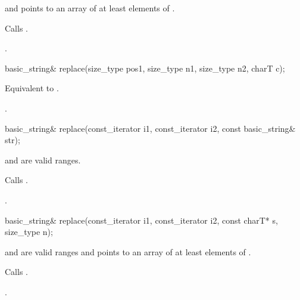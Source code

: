\begin{itemdescr}
\pnum
\requires {} and  points to an array of at least
 elements of .

\pnum
\effects Calls .

\pnum
\returns
{}.
\end{itemdescr}

%
%
\begin{itemdecl}
basic_string&
  replace(size_type pos1, size_type n1,
          size_type n2, charT c);
\end{itemdecl}

\begin{itemdescr}
\pnum
\effects Equivalent to .

\pnum
\returns
{}.
\end{itemdescr}

%
%
\begin{itemdecl}
basic_string& replace(const_iterator i1, const_iterator i2, const basic_string& str);
\end{itemdecl}

\begin{itemdescr}
\pnum
\requires
{} and  are valid ranges.

\pnum
\effects
Calls .

\pnum
\returns
{}.
\end{itemdescr}

%
%
\begin{itemdecl}
basic_string&
  replace(const_iterator i1, const_iterator i2, const charT* s, size_type n);
\end{itemdecl}

\begin{itemdescr}
\pnum
\requires {} and  are valid ranges and
 points to an array of at least  elements of .

\pnum
\effects Calls .

\pnum
\returns
{}.
\end{itemdescr}


